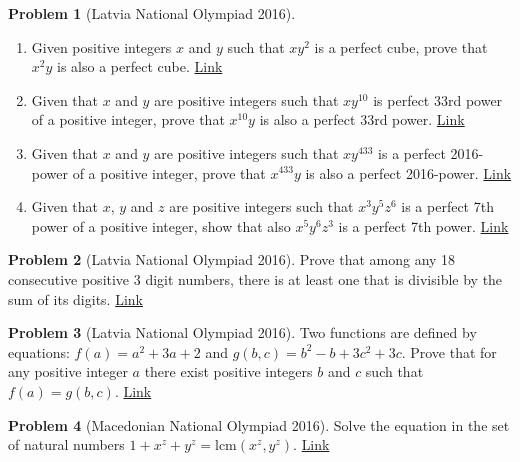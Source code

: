 \documentclass[]{article}
\theoremstyle{definition}
\newtheorem{problem}{Problem}
\begin{document}
\begin{problem}[Latvia National Olympiad 2016]
	$ $
	\begin{enumerate}
		\item Given positive integers $x$ and $y$ such that $xy^2$ is a perfect cube, prove that $x^2y$ is also a perfect cube. \hfill \href{http://artofproblemsolving.com/community/c6h1276625p6698532}{Link}
		\item Given that $x$ and $y$ are positive integers such that $xy^{10}$ is perfect 33rd power of a positive integer, prove that $x^{10}y$ is also a perfect 33rd power. \hfill \href{http://artofproblemsolving.com/community/c6h1276645p6698675}{Link}
		\item Given that $x$ and $y$ are positive integers such that $xy^{433}$ is a perfect 2016-power of a positive integer, prove that $x^{433}y$ is also a perfect 2016-power. \hfill \href{http://artofproblemsolving.com/community/c6h1276664p6698829}{Link}
		\item Given that $x$, $y$ and $z$ are positive integers such that $x^3y^5z^6$ is a perfect 7th power of a positive integer, show that also $x^5y^6z^3$ is a perfect 7th power. \hfill \href{http://artofproblemsolving.com/community/c6h1276676p6699066}{Link}
	\end{enumerate}
\end{problem}





\begin{problem}[Latvia National Olympiad 2016]
	Prove that among any 18 consecutive positive $3$ digit numbers, there is at least one that is divisible by the sum of its digits. \hfill \href{http://artofproblemsolving.com/community/c6h1276687p6699218}{Link}
\end{problem}




\begin{problem}[Latvia National Olympiad 2016]
	Two functions are defined by equations: $f(a) = a^2 + 3a + 2$ and $g(b, c) = b^2 - b + 3c^2 + 3c$. Prove that for any positive integer $a$ there exist positive integers $b$ and $c$ such that $f(a) = g(b, c)$. \flushright \href{http://artofproblemsolving.com/community/c6h1276691p6699257}{Link}
\end{problem}





\begin{problem}[Macedonian National Olympiad 2016]
	Solve the equation in the set of natural numbers $1+x^z + y^z = \text{lcm}(x^z,y^z)$. \hfill \href{http://artofproblemsolving.com/community/c6h1225106p6154392}{Link}
\end{problem}
\end{document}
